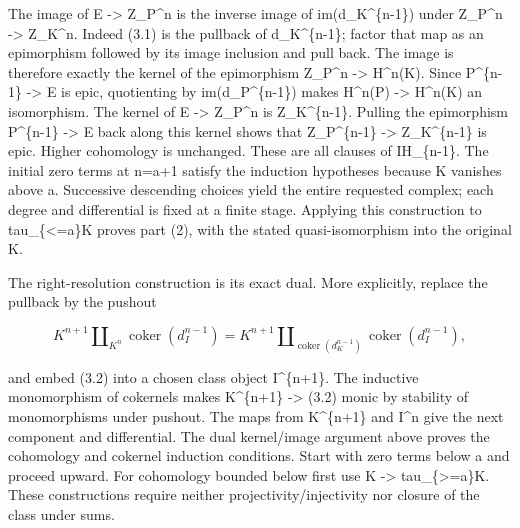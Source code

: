 The image of E \allowbreak{}-> Z\_\allowbreak{}P\textasciicircum{}n is the inverse image of im(d\_\allowbreak{}K\textasciicircum{}\{n-1\})\allowbreak{} under Z\_\allowbreak{}P\textasciicircum{}n \allowbreak{}-> Z\_\allowbreak{}K\textasciicircum{}n. Indeed (3.1)\allowbreak{} is the pullback of d\_\allowbreak{}K\textasciicircum{}\{n-1\}; factor that map as an epimorphism followed by its image inclusion and pull back. The image is therefore exactly the kernel of the epimorphism Z\_\allowbreak{}P\textasciicircum{}n \allowbreak{}-> H\textasciicircum{}n(K)\allowbreak{}. Since P\^{}\{n-1\} \allowbreak{}-> E is epic,\allowbreak{} quotienting by im(d\_\allowbreak{}P\textasciicircum{}\{n-1\})\allowbreak{} makes H\textasciicircum{}n(P)\allowbreak{} \allowbreak{}-> H\textasciicircum{}n(K)\allowbreak{} an isomorphism. The kernel of E \allowbreak{}-> Z\_\allowbreak{}P\textasciicircum{}n is Z\_\allowbreak{}K\textasciicircum{}\{n-1\}. Pulling the epimorphism P\^{}\{n-1\} \allowbreak{}-> E back along this kernel shows that Z\_\allowbreak{}P\textasciicircum{}\{n-1\} \allowbreak{}-> Z\_\allowbreak{}K\textasciicircum{}\{n-1\} is epic. Higher cohomology is unchanged. These are all clauses of IH\_\allowbreak{}\{n-1\}. The initial zero terms at n\allowbreak{}=a\allowbreak{}+1 satisfy the induction hypotheses because K vanishes above a. Successive descending choices yield the entire requested complex; each degree and differential is fixed at a finite stage. Applying this construction to tau\_\allowbreak{}\{<\allowbreak{}=a\}K proves part (2)\allowbreak{},\allowbreak{} with the stated quasi-isomorphism into the original K.

The right-resolution construction is its exact dual. More explicitly,\allowbreak{} replace the pullback by the pushout

\[
 K^{n+1}\mathbin{\amalg}_{K^n}\operatorname{coker}(d_I^{n-1})
 =K^{n+1}\mathbin{\amalg}_{\operatorname{coker}(d_K^{n-1})}
                         \operatorname{coker}(d_I^{n-1}),       \tag{3.2}
\]

and embed (3.2)\allowbreak{} into a chosen class object I\textasciicircum{}\{n\allowbreak{}+1\}. The inductive monomorphism of cokernels makes K\textasciicircum{}\{n\allowbreak{}+1\} \allowbreak{}-> (3.2)\allowbreak{} monic by stability of monomorphisms under pushout. The maps from K\textasciicircum{}\{n\allowbreak{}+1\} and I\^{}n give the next component and differential. The dual kernel/\allowbreak{}image argument above proves the cohomology and cokernel induction conditions. Start with zero terms below a and proceed upward. For cohomology bounded below first use K \allowbreak{}-> tau\_\allowbreak{}\{>\allowbreak{}=a\}K. These constructions require neither projectivity/\allowbreak{}injectivity nor closure of the class under sums.

